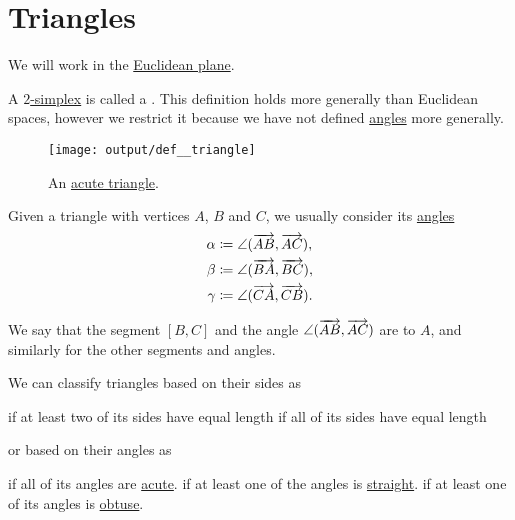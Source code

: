 \section{Triangles}\label{sec:triangles}

We will work in the \hyperref[def:euclidean_plane]{Euclidean plane}.

\begin{definition}\label{def:triangle}
  A \hyperref[def:simplex]{\( 2 \)-simplex} is called a . This definition holds more generally than Euclidean spaces, however we restrict it because we have not defined \hyperref[def:angle]{angles} more generally.

  \begin{figure}[!ht]
    \centering
    \texttt{[image: output/def\_\_triangle]}
    \caption{An \hyperref[def:triangle/measure/acute]{acute triangle}.}\label{fig:def:triangle}
  \end{figure}

  Given a triangle with vertices \( A \), \( B \) and \( C \), we usually consider its \hyperref[def:angle]{ angles}
  \begin{align*}
    \alpha &\coloneqq \angle(\overrightarrow{AB}, \overrightarrow{AC}), \\
    \beta  &\coloneqq \angle(\overrightarrow{BA}, \overrightarrow{BC}), \\
    \gamma &\coloneqq \angle(\overrightarrow{CA}, \overrightarrow{CB}).
  \end{align*}

  We say that the segment \( [B, C] \) and the angle \( \angle(\overrightarrow{AB}, \overrightarrow{AC}) \) are  to \( A \), and similarly for the other segments and angles.

  We can classify triangles based on their sides as
  \begin{thmenum}
      if at least two of its sides have equal length
      if all of its sides have equal length
  \end{thmenum}
  or based on their angles as
  \begin{thmenum}
      if all of its angles are \hyperref[def:angle/measure/acute]{acute}.
      if at least one of the angles is \hyperref[def:angle/measure/straight]{straight}.
      if at least one of its angles is \hyperref[def:angle/measure/obtuse]{obtuse}.
  \end{thmenum}
\end{definition}

